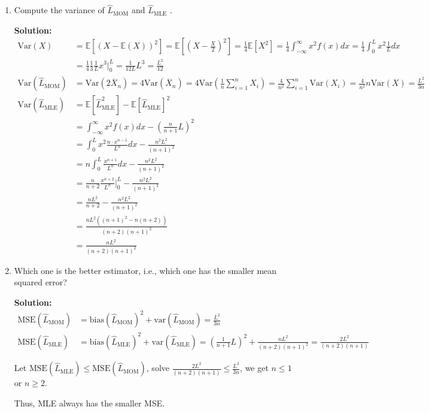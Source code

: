 \documentclass[letter, 12pt]{article}
\begin{document}
\begin{enumerate}[wide = 0pt, label = \arabic*)]
		\item {Compute the variance of $ \hat{L}_{\text{MOM}} $ and $ \hat{L}_{\text{MLE}} $ .}
		\par{\textbf{Solution:}}
		\begin{align*}
			\text{Var}({X}) &= \mathbb{E}[(X - \mathbb{E}(X))^2] = \mathbb{E}[(X - \frac{X}{2})^2] = \frac{1}{4} \mathbb{E}[X^2] = \frac{1}{4} \int_{-\infty}^{\infty} x^2 f(x) dx = \frac{1}{4} \int_{0}^{L} x^2 \frac{1}{L} dx \\
			&= \frac{1}{4} \frac{1}{3} \frac{1}{L} x^3 \Big|_0^L = \frac{1}{12 L} L^3 = \frac{L^2}{12}\\
			\text{Var}(\hat{L}_{\text{MOM}}) &= \text{Var}(2 \overline{X}_n) = 4 \text{Var}(\overline{X}_n) = 4 \text{Var}(\frac{1}{n}\sum_{i=1}^{n} {X}_i) = \frac{4}{n^2} \sum_{i=1}^{n} \text{Var}({X}_i) = \frac{4}{n^2} n \text{Var}({X}) = \frac{L^2}{3 n} \\
			\text{Var}(\hat{L}_{\text{MLE}}) &= \mathbb{E}[\hat{L}_{\text{MLE}}^2] - \mathbb{E}[\hat{L}_{\text{MLE}}]^2 \\
			&= \int_{-\infty}^{\infty} x^2 f(x) dx - (\frac{n}{n+1}L)^2 \\
			&= \int_{0}^{L} x^2 \frac{n \cdot x^{n-1}}{L^n} dx - \frac{n^2 L^2}{(n+1)^2} \\
			&= n \int_{0}^{L} \frac{x^{n+1}}{L^n} dx - \frac{n^2 L^2}{(n+1)^2} \\
			&= \frac{n}{n+2} \frac{x^{n+2}}{L^n} \Big|_{0}^L - \frac{n^2 L^2}{(n+1)^2} \\
			&= \frac{n L^2}{n+2} - \frac{n^2 L^2}{(n+1)^2} \\
			&= \frac{n L^2 ((n+1)^2 - n(n+2))}{(n+2)(n+1)^2} \\
			&= \frac{n L^2}{(n+2)(n+1)^2}
		\end{align*}
		
		\item {Which one is the better estimator, i.e., which one has the smaller mean squared error?}
		\par{\textbf{Solution:}}
		\begin{align*}
			\text{MSE}(\hat{L}_{\text{MOM}}) &= \text{bias}(\hat{L}_{\text{MOM}})^2 + \text{var}(\hat{L}_{\text{MOM}}) = \frac{L^2}{3 n} \\
			\text{MSE}(\hat{L}_{\text{MLE}}) &= \text{bias}(\hat{L}_{\text{MLE}})^2 + \text{var}(\hat{L}_{\text{MLE}}) = (\frac{1}{n+1} L)^2 + \frac{n L^2}{(n+2)(n+1)^2} = \frac{2 L^2}{(n+2)(n+1)} 
		\end{align*}
		\par{Let $ \text{MSE}(\hat{L}_{\text{MLE}}) \le \text{MSE}(\hat{L}_{\text{MOM}}) $, solve $ \frac{2 L^2}{(n+2)(n+1)} \le \frac{L^2}{3 n} $, we get $ n \le 1 $ or $ n \ge 2 $.}
		\par{Thus, MLE always has the smaller MSE.}
		

\end{enumerate}
\end{document}
